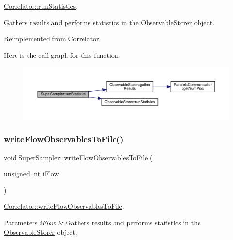 \mbox{\hyperlink{class_correlator_a35197b1d12b62ef30b79c0138a26456e}{Correlator\+::run\+Statistics}}. 

Gathers results and performs statistics in the \mbox{\hyperlink{class_observable_storer}{Observable\+Storer}} object. 

Reimplemented from \mbox{\hyperlink{class_correlator_a35197b1d12b62ef30b79c0138a26456e}{Correlator}}.

Here is the call graph for this function\+:\nopagebreak
\begin{figure}[H]
\begin{center}
\leavevmode
\includegraphics[width=350pt]{class_super_sampler_af96f7d461e9159adb4eef9bda9c6ecde_cgraph}
\end{center}
\end{figure}
\mbox{\label{class_super_sampler_a410b650ebccdb03519c88908a3a8013e}} 
\subsubsection{\texorpdfstring{writeFlowObservablesToFile()}{writeFlowObservablesToFile()}}
{\footnotesize\ttfamily void Super\+Sampler\+::write\+Flow\+Observables\+To\+File (\begin{DoxyParamCaption}\item[{unsigned int}]{i\+Flow }\end{DoxyParamCaption})\hspace{0.3cm}{\ttfamily [virtual]}}



\mbox{\hyperlink{class_correlator_a168512b2ce182d9478db47f100125fa6}{Correlator\+::write\+Flow\+Observables\+To\+File}}. 


\begin{DoxyParams}{Parameters}
{\em i\+Flow} & Gathers results and performs statistics in the \mbox{\hyperlink{class_observable_storer}{Observable\+Storer}} object. \\
\hline
\end{DoxyParams}


